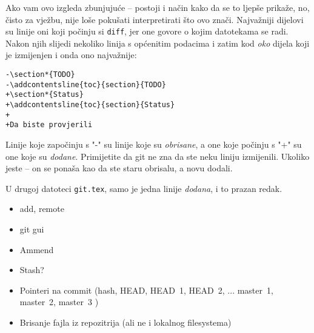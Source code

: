 Ako vam ovo izgleda zbunjujuće -- postoji i način kako da se to ljepše prikaže, no, čisto za vježbu, nije loše pokušati interpretirati što ovo znači.
Najvažniji dijelovi su linije oni koji počinju si \verb+diff+, jer one govore o kojim datotekama se radi.
Nakon njih slijedi nekoliko linija s općenitim podacima i zatim kod \emph{oko} dijela koji je izmijenjen i onda ono najvažnije:

\begin{verbatim}
-\section*{TODO}
-\addcontentsline{toc}{section}{TODO}
+\section*{Status}
+\addcontentsline{toc}{section}{Status}
+
+Da biste provjerili 
\end{verbatim}

Linije koje započinju s "-" su linije koje su \emph{obrisane}, a one koje počinju s "+" su one koje su \emph{dodane}. 
Primijetite da git ne zna da ste neku liniju izmijenili. 
Ukoliko jeste -- on se ponaša kao da ste staru obrisalu, a novu dodali.

U drugoj datoteci \verb+git.tex+, samo je jedna linije \emph{dodana}, i to prazan redak.

\begin{itemize}
   \item add, remote
   \item git gui
   \item Ammend
   \item Stash?
   \item Pointeri na commit (hash, HEAD, HEAD~1, HEAD~2, ... master~1, master~2, master~3 )
   \item Brisanje fajla iz repozitrija (ali ne i lokalnog filesystema)
\end{itemize}


